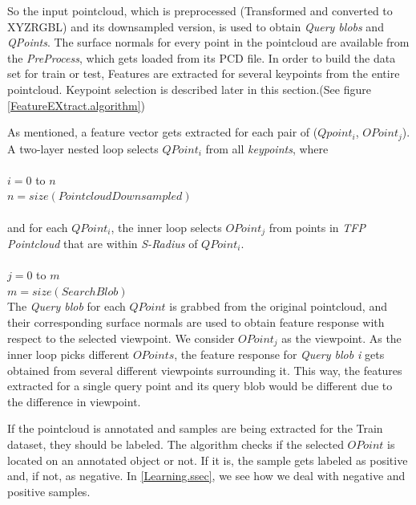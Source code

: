 So the input pointcloud, which is preprocessed (Transformed and converted to XYZRGBL) and its downsampled version, is used to obtain {\it Query blobs} and {\it QPoints}. The surface normals for every point in the pointcloud are available from the {\it PreProcess}, which gets loaded from its PCD file. In order to build the data set for train or test, Features are extracted for several keypoints from 
the entire pointcloud. Keypoint selection is described later in this section.(See figure \ref{FeatureEXtract.algorithm}) 


As mentioned, a feature vector gets extracted for each pair of ($Qpoint_i$, $OPoint_j$). A two-layer nested loop selects $QPoint_i$ from all {\it keypoints}, where\\
\\
$i = 0$ to $n$ \\
$n = size(PointcloudDownsampled)$\\
\\
and for each $QPoint_i$, the inner loop selects $OPoint_j$ from points in {\it TFP Pointcloud} that are within {\it S-Radius} of $QPoint_i$.\\
\\
$j = 0$ to $m$\\
$m = size(SearchBlob)$\\




The {\it Query blob} for each $QPoint$ is grabbed from the original pointcloud, and their corresponding surface normals are used to obtain feature response with respect to the selected viewpoint. We consider $OPoint_j$ as the viewpoint. As the inner loop picks different $OPoints$, the feature response for {\it Query blob i} gets obtained from several different viewpoints surrounding it. This way, the features extracted for a single query point and its query blob would be different due to the difference in viewpoint.


If the pointcloud is annotated and samples are being extracted for the Train dataset, they should be labeled. The algorithm checks if the selected $OPoint$ is located on an annotated object or not. If it is, the sample gets labeled as positive and, if not, as negative. In \ref{Learning.ssec}, we see how we deal with negative and positive samples.

